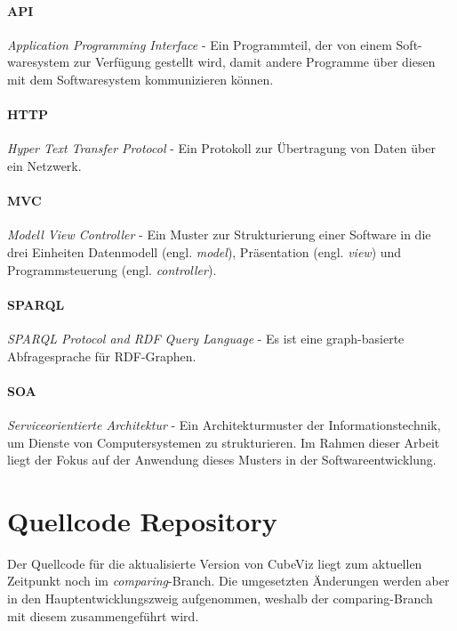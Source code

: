\documentclass[11pt]{article}
\begin{document}
\paragraph{API} \textit{Application Programming Interface} - Ein Programmteil, der von einem Soft-waresystem zur Verfügung gestellt wird, damit andere Programme über diesen mit dem Softwaresystem kommunizieren können.

\paragraph{HTTP} \textit{Hyper Text Transfer Protocol} - Ein Protokoll zur Übertragung von Daten über ein Netzwerk. \cite{HTTP-SPEC}

\paragraph{MVC} \textit{Modell View Controller} - Ein Muster zur Strukturierung einer Software in die drei Einheiten Datenmodell (engl. \textit{model}), Präsentation (engl. \textit{view}) und Programmsteuerung (engl. \textit{controller}). \cite{MVC-ORIGIN}

\paragraph{SPARQL} \textit{SPARQL Protocol and RDF Query Language} - Es ist eine graph-basierte Abfragesprache für RDF-Graphen. \cite{SPARQL-SPEC}

\paragraph{SOA} \textit{Serviceorientierte Architektur} - Ein Architekturmuster der Informationstechnik, um Dienste von Computersystemen zu strukturieren. Im Rahmen dieser Arbeit liegt der Fokus auf der Anwendung dieses Musters in der Softwareentwicklung. \cite{SOA-INTRO}


%
%
\newpage

\section{Quellcode Repository}
\label{sec:appendixSourceCode}

Der Quellcode für die aktualisierte Version von CubeViz liegt zum aktuellen Zeitpunkt noch im \textit{comparing}-Branch. Die umgesetzten Änderungen werden aber in den Hauptentwicklungszweig aufgenommen, weshalb der comparing-Branch mit diesem zusammengeführt wird. \\
\end{document}
